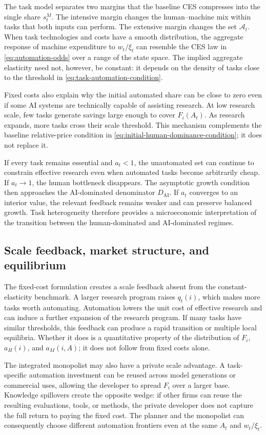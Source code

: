 The task model separates two margins that the baseline CES compresses into the
single share $s^M_t$. The intensive margin changes the human--machine mix within
tasks that both inputs can perform. The extensive margin changes the set
$\mathcal A_t$. When task technologies and costs have a smooth distribution, the
aggregate response of machine expenditure to $w_t/\xi_t$ can resemble the CES law
in \eqref{eq:automation-odds} over a range of the state space. The implied aggregate
elasticity need not, however, be constant: it depends on the density of tasks close
to the threshold in \eqref{eq:task-automation-condition}.

Fixed costs also explain why the initial automated share can be close to zero even
if some AI systems are technically capable of assisting research. At low research
scale, few tasks generate savings large enough to cover $F_i(A_t)$. As research
expands, more tasks cross their scale threshold. This mechanism complements the
baseline relative-price condition in
\eqref{eq:initial-human-dominance-condition}; it does not replace it.

If every task remains essential and $a_t<1$, the unautomated set can continue to
constrain effective research even when automated tasks become arbitrarily cheap.
If $a_t\to1$, the human bottleneck disappears. The asymptotic growth condition then
approaches the AI-dominated denominator $D_{\mathrm{AI}}$. If $a_t$ converges to an
interior value, the relevant feedback remains weaker and can preserve balanced
growth. Task heterogeneity therefore provides a microeconomic interpretation of
the transition between the human-dominated and AI-dominated regimes.

\subsection{Scale feedback, market structure, and equilibrium}

The fixed-cost formulation creates a scale feedback absent from the constant-
elasticity benchmark. A larger research program raises $q_t(i)$, which makes more
tasks worth automating. Automation lowers the unit cost of effective research and
can induce a further expansion of the research program. If many tasks have similar
thresholds, this feedback can produce a rapid transition or multiple local
equilibria. Whether it does is a quantitative property of the distribution of
$F_i$, $a_H(i)$, and $a_M(i,A)$; it does not follow from fixed costs alone.

The integrated monopolist may also have a private scale advantage. A task-specific
automation investment can be reused across model generations or commercial uses,
allowing the developer to spread $F_i$ over a larger base. Knowledge spillovers
create the opposite wedge: if other firms can reuse the resulting evaluations,
tools, or methods, the private developer does not capture the full return to paying
the fixed cost. The planner and the monopolist can consequently choose different
automation frontiers even at the same $A_t$ and $w_t/\xi_t$.

